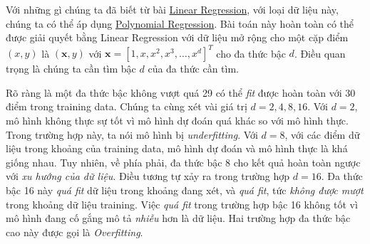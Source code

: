  
 
 
 
Với những gì chúng ta đã biết từ bài \href{http://machinelearningcoban.com/2016/12/28/linearregression/#cac-bai-toan-co-the-giai-bang-linear-regression}{Linear Regression}, với loại dữ liệu này, chúng ta có thể áp dụng \href{https://en.wikipedia.org/wiki/Polynomial_regression}{Polynomial Regression}. Bài toán này hoàn toàn có thể được giải quyết bằng Linear Regression với dữ liệu mở rộng cho một cặp điểm $(x, y)$ là $(\mathbf{x}, y)$ với $\mathbf{x} = [1, x, x^2, x^3, \dots, x^d]^T$ cho đa thức bậc $d$. Điều quan trọng là chúng ta cần tìm bậc $d$ của đa thức cần tìm. 
 
Rõ ràng là một đa thức bậc không vượt quá 29 có thể \textit{fit} được hoàn toàn với 30 điểm trong training data. Chúng ta cùng xét vài giá trị $d = 2, 4, 8, 16$. Với $d = 2$, mô hình không thực sự tốt vì mô hình dự đoán quá khác so với mô hình thực. Trong trường hợp này, ta nói mô hình bị \textit{underfitting}. Với $d = 8$, với các điểm dữ liệu trong khoảng của training data, mô hình dự đoán và mô hình thực là khá giống nhau. Tuy nhiên, về phía phải, đa thức bậc 8 cho kết quả hoàn toàn ngược với \textit{xu hướng của dữ liệu}. Điều tương tự xảy ra trong trường hợp $d = 16$. Đa thức bậc 16 này \textit{quá fit} dữ liệu trong khoảng đang xét, và \textit{quá fit}, tức \textit{không được mượt} trong khoảng dữ liệu training. Việc \textit{quá fit} trong trường hợp bậc 16 không tốt vì mô hình đang cố gắng mô tả \textit{nhiễu} hơn là dữ liệu. Hai trường hợp đa thức bậc cao này được gọi là \textit{Overfitting}. 
 
